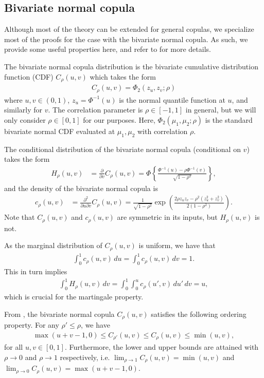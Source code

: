 \documentclass[11pt,a4paper]{article}
\begin{document}
\begin{appendices}
\subsection{Bivariate normal copula}\label{app:sec_copula}
Although most of the theory can be extended for general copulas, we specialize most of the proofs for the case with the bivariate normal copula. As such, we provide some useful properties here, and refer to \cite{Meyer2013} for more details.

The bivariate normal copula distribution is the bivariate cumulative distribution function (CDF) $C_\rho(u,v)$ which takes the form
\begin{align*}
C_\rho(u,v) = \Phi_2\left(z_u, z_v; \rho\right)
\end{align*}
where $u,v \in (0,1)$, $z_u = \Phi^{-1}(u)$ is the normal quantile function at $u$, and similarly for $v$. The correlation parameter is $\rho \in [-1,1]$ in general, but we will only consider $\rho \in [0,1]$ for our purposes.  
Here, $\Phi_2(\mu_1, \mu_2; \rho)$ is the standard bivariate normal CDF evaluated at $\mu_1,\mu_2$ with correlation $\rho$.  

The conditional distribution of the bivariate normal copula (conditional on $v$) takes the form
\begin{align*}
    H_\rho(u,v) &= \frac{\partial}{\partial v} C_\rho(u,v) =\Phi\left\{\frac{\Phi^{-1}\left(u\right) - \rho \Phi^{-1}(v)}{\sqrt{1-\rho^2}}\right\},
\end{align*}
and the density of the bivariate normal copula is
\begin{align*}
    c_\rho(u,v) &= \frac{\partial^2}{\partial u \partial v}C_\rho(u,v) =  \frac{1}{\sqrt{1-\rho^2}}\exp\left( \frac{2\rho z_u z_v - \rho^2(z_u^2 + z_v^2)}{2(1-\rho^2)}\right).
\end{align*}
Note that $C_\rho(u,v)$ and $c_\rho(u,v)$ are symmetric in its inputs, but $H_\rho(u,v)$ is not.

As the marginal distribution of $C_\rho(u,v)$ is uniform, we have that
\begin{align*}
    \int_0^1 c_\rho(u,v) \, du =  \int_0^1 c_\rho(u,v) \, dv = 1.
\end{align*}
This in turn implies
\begin{align*}
    \int_0^1 H_\rho(u,v) \, dv =\int_0^1 \int_0^u c_\rho(u',v) \, du'\, dv = u,
\end{align*}
which is crucial for the martingale property.

From \cite{Meyer2013}, the bivariate normal copula $C_\rho(u,v)$ satisfies the following ordering property. For any $\rho' \leq \rho$, we have
\begin{align*}
    \max(u+v-1,0) \leq C_{\rho'}(u,v) \leq C_{\rho}(u,v) \leq \min(u,v),
\end{align*}
for all $u,v \in [0,1]$. Furthermore, the lower and upper bounds are attained with $\rho   \to 0 $ and $\rho \to 1$ respectively, i.e. $\lim_{\rho \to 1}C_\rho(u,v) = \min(u,v)$ and $\lim_{\rho \to 0}C_\rho(u,v) = \max(u+v-1,0)$.



\end{appendices}
\end{document}
